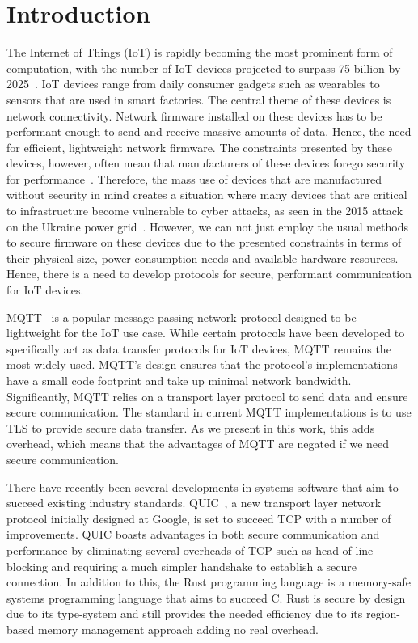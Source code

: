 \chapter{Introduction}


The Internet of Things (IoT) is rapidly becoming the most prominent form of computation, with the number of IoT devices projected to surpass 75 billion by 2025~\citep{statista_number_2016}.
IoT devices range from daily consumer gadgets such as wearables to sensors that are used in smart factories.
The central theme of these devices is network connectivity.
Network firmware installed on these devices has to be performant enough to send and receive massive amounts of data. 
Hence, the need for efficient, lightweight network firmware.
The constraints presented by these devices, however, often mean that manufacturers of these devices forego security for performance~\cite{ling_iot_2018}.
Therefore, the mass use of devices that are manufactured without security in mind creates a situation where many devices that are critical to infrastructure become vulnerable to cyber attacks, as seen in the 2015 attack on the Ukraine power grid~\citep{Liang2017}.
However, we can not just employ the usual methods to secure firmware on these devices due to the presented constraints in terms of their physical size, power consumption needs and available hardware resources.
Hence, there is a need to develop protocols for secure, performant communication for IoT devices.

MQTT~\citep{oasis_mqtt_2014} is a popular message-passing network protocol designed to be lightweight for the IoT use case.
While certain protocols have been developed to specifically act as data transfer protocols for IoT devices, MQTT remains the most widely used.
MQTT's design ensures that the protocol's implementations have a small code footprint and take up minimal network bandwidth.
Significantly, MQTT relies on a transport layer protocol to send data and ensure secure communication.
The standard in current MQTT implementations is to use TLS to provide secure data transfer.
As we present in this work, this adds overhead, which means that the advantages of MQTT are negated if we need secure communication.

There have recently been several developments in systems software that aim to succeed existing industry standards.
QUIC~\citep{iyengar_quic_2021}, a new transport layer network protocol initially designed at Google, is set to succeed TCP with a number of improvements.
QUIC boasts advantages in both secure communication and performance by eliminating several overheads of TCP such as head of line blocking and requiring a much simpler handshake to establish a secure connection.
In addition to this, the Rust programming language is a memory-safe systems programming language that aims to succeed C.
Rust is secure by design due to its type-system and still provides the needed efficiency due to its region-based memory management approach adding no real overhead.

